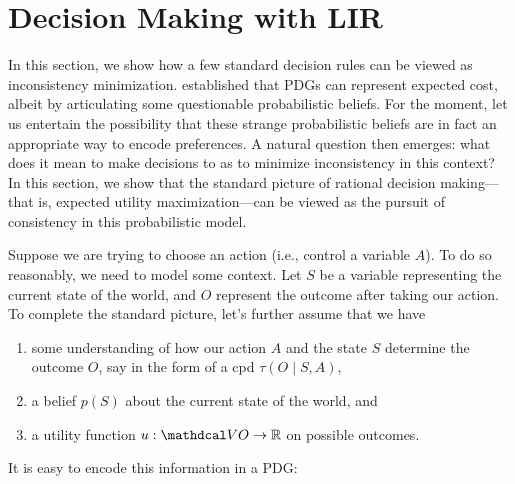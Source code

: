 \documentclass{article} %
\theoremstyle{plain}
\theoremstyle{definition}
\theoremstyle{remark}
\begin{document}

\section{Decision Making with LIR}

In this section, we show how a few standard decision rules can be viewed as inconsistency minimization. 
% 
 established that PDGs can represent expected cost,
albeit by articulating some questionable probabilistic beliefs. 
For the moment, let us entertain the possibility that these strange probabilistic beliefs are in fact an appropriate way to encode preferences.
A natural question then emerges: what does it mean to make decisions to as to minimize inconsistency in this context? 
In this section, we show that the standard picture of rational decision making---that is, expected utility maximization---can be viewed as the pursuit of consistency in this probabilistic model. 

Suppose we are trying to choose an action (i.e., control a variable $A$). 
To do so reasonably, we need to model some context. 
Let $S$ be a variable representing the current state of the world,
and $O$ represent the outcome after taking our action. 
%
To complete the standard picture, let's further assume that 
we have 
\begin{enumerate}[nosep]
\item 
   some understanding of how our action $A$ and the state $S$ determine the outcome $O$, say in the form of a cpd $\tau(O \mid S,A)$, 
\item 
a belief $p(S)$ about the current state of the world,
and 
\item  a utility function $u : \V O \to \mathbb R$ on possible outcomes. 
\end{enumerate}
It is easy to encode this information in a PDG:
\end{document}
